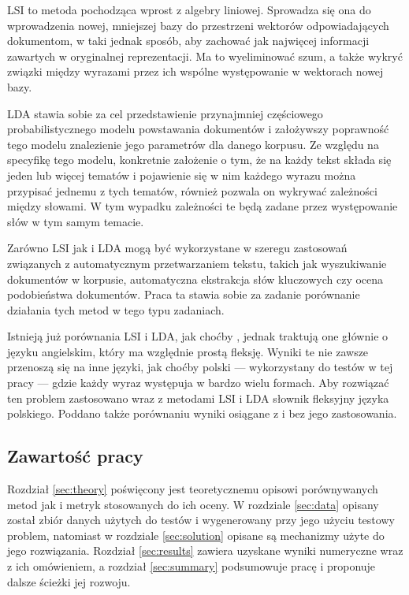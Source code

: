 \documentclass[11pt,a4paper]{article}
\begin{document}
LSI to metoda pochodząca wprost z algebry liniowej. Sprowadza się ona do
wprowadzenia nowej, mniejszej bazy do przestrzeni wektorów odpowiadających
dokumentom, w taki jednak sposób, aby zachować jak najwięcej informacji
zawartych w oryginalnej reprezentacji. Ma to wyeliminować szum, a także wykryć
związki między wyrazami przez ich wspólne występowanie w wektorach nowej bazy.

LDA stawia sobie za cel przedstawienie przynajmniej częściowego
probabilistycznego modelu powstawania dokumentów i założywszy poprawność tego
modelu znalezienie jego parametrów dla danego korpusu. Ze względu na specyfikę
tego modelu, konkretnie założenie o tym, że na każdy tekst składa się jeden lub
więcej tematów i pojawienie się w nim każdego wyrazu można przypisać jednemu z
tych tematów, również pozwala on wykrywać zależności między słowami. W tym
wypadku zależności te będą zadane przez występowanie słów w tym samym temacie.

Zarówno LSI jak i LDA mogą być wykorzystane w szeregu zastosowań związanych z
automatycznym przetwarzaniem tekstu, takich jak wyszukiwanie dokumentów w
korpusie, automatyczna ekstrakcja słów kluczowych czy ocena podobieństwa
dokumentów. Praca ta stawia sobie za zadanie porównanie działania tych metod
w tego typu zadaniach.

Istnieją już porównania LSI i LDA, jak choćby \cite{lda-paper}, jednak traktują
one głównie o języku angielskim, który ma względnie prostą fleksję. Wyniki te
nie zawsze przenoszą się na inne języki, jak choćby polski --- wykorzystany do
testów w tej pracy --- gdzie każdy wyraz występuja w bardzo wielu formach. Aby
rozwiązać ten problem zastosowano wraz z metodami LSI i LDA słownik fleksyjny
języka polskiego. Poddano także porównaniu wyniki osiągane z i bez jego
zastosowania.

\subsection{Zawartość pracy}

Rozdział \ref{sec:theory} poświęcony jest teoretycznemu opisowi porównywanych
metod jak i metryk stosowanych do ich oceny. W rozdziale \ref{sec:data} opisany
został zbiór danych użytych do testów i wygenerowany przy jego użyciu testowy
problem, natomiast w rozdziale \ref{sec:solution} opisane są mechanizmy użyte
do jego rozwiązania. Rozdział \ref{sec:results} zawiera uzyskane wyniki
numeryczne wraz z ich omówieniem, a rozdział \ref{sec:summary} podsumowuje
pracę i proponuje dalsze ścieżki jej rozwoju.
\end{document}

